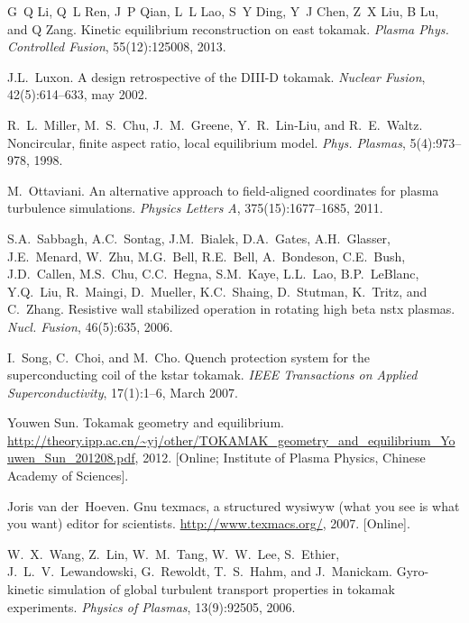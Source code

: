 \documentclass{article}
\newcommand{\tmtextit}[1]{{\itshape{#1}}}
\begin{document}
\begin{thebibliography}{10}
  G~Q Li, Q~L Ren, J~P Qian, L~L Lao, S~Y Ding, Y~J Chen,
  Z~X Liu, B Lu, and  Q Zang. {\newblock}Kinetic equilibrium reconstruction on
  east tokamak. {\newblock}\tmtextit{Plasma Phys. Controlled Fusion},
  55(12):125008, 2013.{\newblock}
  
  J.L.~Luxon. {\newblock}A design retrospective of the
  DIII-D tokamak. {\newblock}\tmtextit{Nuclear Fusion}, 42(5):614--633, may
  2002.{\newblock}
  
  R.~L.~Miller, M.~S.~Chu, J.~M.~Greene,
  Y.~R.~Lin-Liu, and  R.~E.~Waltz. {\newblock}Noncircular, finite aspect
  ratio, local equilibrium model. {\newblock}\tmtextit{Phys. Plasmas},
  5(4):973--978, 1998.{\newblock}
  
  M.~Ottaviani. {\newblock}An alternative approach
  to field-aligned coordinates for plasma turbulence simulations.
  {\newblock}\tmtextit{Physics Letters A}, 375(15):1677--1685,
  2011.{\newblock}
  
  S.A.~Sabbagh, A.C.~Sontag, J.M.~Bialek, D.A.~Gates,
  A.H.~Glasser, J.E.~Menard, W.~Zhu, M.G.~Bell, R.E.~Bell, A.~Bondeson,
  C.E.~Bush, J.D.~Callen, M.S.~Chu, C.C.~Hegna, S.M.~Kaye, L.L.~Lao,
  B.P.~LeBlanc, Y.Q.~Liu, R.~Maingi, D.~Mueller, K.C.~Shaing, D.~Stutman,
  K.~Tritz, and  C.~Zhang. {\newblock}Resistive wall stabilized operation in
  rotating high beta nstx plasmas. {\newblock}\tmtextit{Nucl. Fusion},
  46(5):635, 2006.{\newblock}
  
  I.~Song, C.~Choi, and  M.~Cho. {\newblock}Quench
  protection system for the superconducting coil of the kstar tokamak.
  {\newblock}\tmtextit{IEEE Transactions on Applied Superconductivity},
  17(1):1--6, March 2007.{\newblock}
  
  Youwen Sun. {\newblock}Tokamak geometry and
  equilibrium.
  {\newblock}\url{http://theory.ipp.ac.cn/~yj/other/TOKAMAK_geometry_and_equilibrium_Youwen_Sun_201208.pdf},
  2012. {\newblock}[Online; Institute of Plasma Physics, Chinese Academy of
  Sciences].{\newblock}
  
  Joris van der~Hoeven. {\newblock}Gnu texmacs, a
  structured wysiwyw (what you see is what you want) editor for scientists.
  {\newblock}\url{http://www.texmacs.org/}, 2007.
  {\newblock}[Online].{\newblock}
  
  W.~X.~Wang, Z.~Lin, W.~M.~Tang, W.~W.~Lee,
  S.~Ethier, J.~L.~V.~Lewandowski, G.~Rewoldt, T.~S.~Hahm, and  J.~Manickam.
  {\newblock}Gyro-kinetic simulation of global turbulent transport properties
  in tokamak experiments. {\newblock}\tmtextit{Physics of Plasmas},
  13(9):92505, 2006.{\newblock}
  

\end{thebibliography}
\end{document}
